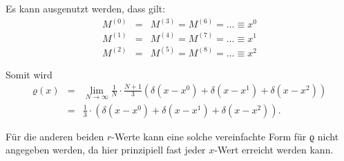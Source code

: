 Es kann ausgenutzt werden, dass gilt:
\begin{eqnarray}
M^{(0)} &=& M^{(3)} = M^{(6)} = … \equiv x^0\\
M^{(1)} &=& M^{(4)} = M^{(7)} = … \equiv x^1\\
M^{(2)} &=& M^{(5)} = M^{(8)} = … \equiv x^2
\end{eqnarray}

Somit wird
\begin{eqnarray}
ϱ(x) &=& \lim_{N\to\infty}\frac{1}{N}\cdot\frac{N+1}{3}(δ(x - x^0) + δ(x
- x^1) + δ(x - x^2))\\
&=& \frac{1}{3}\cdot(δ(x - x^0) + δ(x - x^1) + δ(x - x^2)).
\end{eqnarray}

Für die anderen beiden $r$-Werte kann eine solche vereinfachte Form für ϱ nicht
angegeben werden, da hier prinzipiell fast jeder $x$-Wert erreicht werden kann.